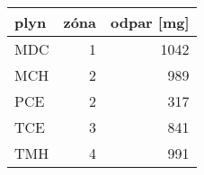 \begin{tabular}{lrr}
\toprule
plyn & zóna&odpar [\si{mg}]\\
\midrule
 MDC & 1&   1042           \\
 MCH &2&    989            \\
 PCE &2&    317            \\
 TCE &3&    841            \\
 TMH &4&    991            \\
\bottomrule
\end{tabular}
